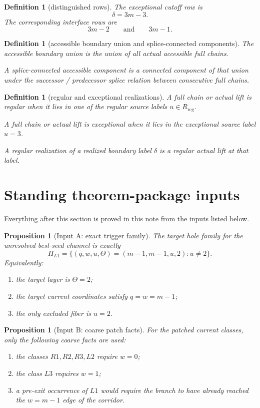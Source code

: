 \documentclass[11pt]{article}
\newtheorem{proposition}[theorem]{Proposition}
\newtheorem{definition}[theorem]{Definition}
\begin{document}
\begin{definition}[distinguished rows]
The \emph{exceptional cutoff row} is
\[
\delta=3m-3.
\]
The corresponding interface rows are
\[
3m-2
\qquad\text{and}\qquad
3m-1.
\]
\end{definition}

\begin{definition}[accessible boundary union and splice-connected components]
The \emph{accessible boundary union} is the union of all actual accessible full
chains.

A \emph{splice-connected accessible component} is a connected component of that
union under the successor / predecessor splice relation between consecutive full
chains.
\end{definition}

\begin{definition}[regular and exceptional realizations]
A full chain or actual lift is \emph{regular} when it lies in one of the
regular source labels $u\in R_{\mathrm{reg}}$.

A full chain or actual lift is \emph{exceptional} when it lies in the
exceptional source label $u=3$.

A \emph{regular realization} of a realized boundary label $\delta$ is a regular
actual lift at that label.
\end{definition}

\section{Standing theorem-package inputs}

Everything after this section is proved in this note from the inputs listed
below.

\begin{proposition}[Input A: exact trigger family]
The target hole family for the unresolved best-seed channel is exactly
\[
H_{L1}=\{(q,w,u,\Theta)=(m-1,m-1,u,2):u\neq 2\}.
\]
Equivalently:
\begin{enumerate}[label=\textup{(\arabic*)},leftmargin=2.5em]
\item the target layer is $\Theta=2$;
\item the target current coordinates satisfy $q=w=m-1$;
\item the only excluded fiber is $u=2$.
\end{enumerate}
\end{proposition}

\begin{proposition}[Input B: coarse patch facts]
For the patched current classes, only the following coarse facts are used:
\begin{enumerate}[label=\textup{(\arabic*)},leftmargin=2.5em]
\item the classes $R1,R2,R3,L2$ require $w=0$;
\item the class $L3$ requires $w=1$;
\item a pre-exit occurrence of $L1$ would require the branch to have already
      reached the $w=m-1$ edge of the corridor.
\end{enumerate}
\end{proposition}
\end{document}
